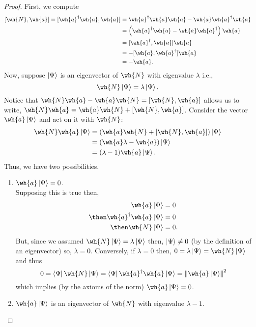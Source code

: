 \documentclass[12pt, a4paper]{article}
\begin{document}
\begin{proof}
    First, we compute 
    \[\begin{aligned}
        [\wh{N},\wh{a}] = [\wh{a}^{\dagger}\wh{a},\wh{a}] &= \wh{a}^{\dagger}\wh{a}\wh{a}-\wh{a}\wh{a}^{\dagger}\wh{a} \\
        &= \left( \wh{a}^{\dagger}\wh{a}-\wh{a}\wh{a}^{\dagger} \right)\wh{a} \\
        &= [\wh{a}^{\dagger},\wh{a}] \wh{a} \\\
        &= -[\wh{a},\wh{a}^{\dagger}] \wh{a} \\
        &= - \wh{a}.
    \end{aligned}\]
    Now, suppose \(\ket{\Psi}\) is an eigenvector of \(\wh{N}\) with eigenvalue \(\lambda\) i.e.,
    \[\wh{N}\ket{\Psi} = \lambda \ket{\Psi}.\] 
    Notice that \(\wh{N}\wh{a}-\wh{a}\wh{N}=[\wh{N},\wh{a}]\) allows us to write, \(\wh{N}\wh{a}=\wh{a}\wh{N}+[\wh{N},\wh{a}]\). Consider the vector \(\wh{a}\ket{\Psi}\) and act on it with \(\wh{N}\): 
    \[\begin{aligned}
        \wh{N} \wh{a} \ket{\Psi} &= \left( \wh{a}\wh{N}+[\wh{N},\wh{a}] \right) \ket{\Psi} \\
        &= \left( \wh{a}\lambda-\wh{a} \right)\ket{\Psi} \\
        &= (\lambda -1) \wh{a} \ket{\Psi}.
    \end{aligned}\]
    Thus, we have two possibilities.
    \begin{enumerate}
        \item \(\wh{a}\ket{\Psi}=0\). \\
        Supposing this is true then,
        \[\begin{aligned}
            \wh{a} \ket{\Psi} &= 0 \\
            \then \wh{a}^{\dagger} \wh{a} \ket{\Psi} &= 0 \\
            \then \wh{N} \ket{\Psi} &= 0.
        \end{aligned}\]
        But, since we assumed \(\wh{N} \ket{\Psi}=\lambda \ket{\Psi}\) then, \(\ket{\Psi} \neq 0\) (by the definition of an eigenvector) so, \(\lambda =0\). Conversely, if \(\lambda= 0\) then, \(0=\lambda \ket{\Psi}= \wh{N} \ket{\Psi}\) and thus
        \[0=\bra{\Psi}\wh{N} \ket{\Psi} = \bra{\Psi} \wh{a}^{\dagger}\wh{a}\ket{\Psi} = \norm{\wh{a}\ket{\Psi}}^2\]
        which implies (by the axioms of the norm) \(\wh{a} \ket{\Psi}=0\).
        \item \(\wh{a}\ket{\Psi}\) is an eigenvector of \(\wh{N}\) with eigenvalue \(\lambda-1\).
    \end{enumerate}
\end{proof}
\end{document}
